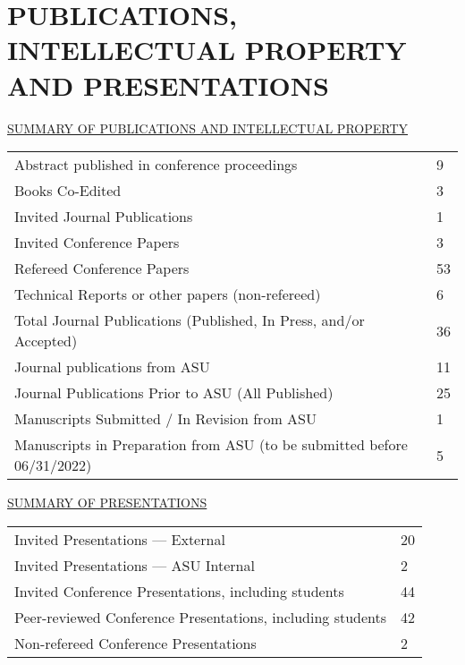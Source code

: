 \documentclass[letterpaper, 12pt]{extarticle}
\begin{document}
\part*{\uppercase{Publications, Intellectual Property and Presentations}}
\uppercase{\underline{Summary of Publications and Intellectual Property}}

\begin{tabular}{p{}p{}}
	Abstract published in conference proceedings      & 9  \\
	Books Co-Edited                                   & 3  \\
	Invited Journal Publications                      & 1  \\
	Invited Conference Papers                         & 3  \\
	Refereed Conference Papers                        & 53 \\
	Technical Reports or other papers (non-refereed)  & 6  \\
	Total Journal Publications \newline
	(Published, In Press, and/or Accepted)            & 36 \\
	Journal publications from ASU                     & 11 \\
	Journal Publications Prior to ASU (All Published) & 25 \\
	Manuscripts Submitted / In Revision from ASU      & 1  \\
	Manuscripts in Preparation from ASU \newline
	(to be submitted before 06/31/2022)               & 5  \\
\end{tabular}

\vspace{1ex}
\uppercase{\underline{Summary of Presentations}}

\begin{tabular}{p{}p{}}
	Invited Presentations --- External     & 20 \\
	Invited Presentations --- ASU Internal & 2  \\
	Invited Conference Presentations, \newline
	including students                     & 44 \\
	Peer-reviewed Conference Presentations, \newline
	including students                     & 42 \\
	Non-refereed Conference Presentations  & 2  \\
\end{tabular}
\end{document}
